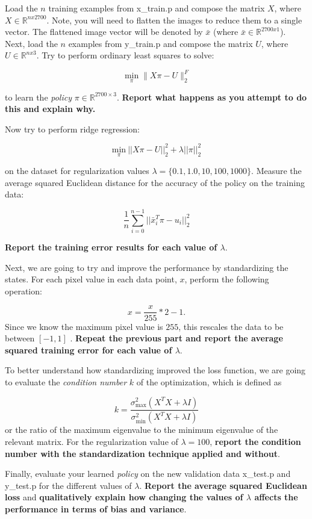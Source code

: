 \begin{Parts}
\Part Load the $n$ training examples from x\_train.p and compose the matrix $X$, where $X \in \mathbb{R}^{nx2700}$. Note, you will need to flatten the images to reduce them to a single vector. The flattened image vector will be denoted by $\bar{x}$ (where $\bar{x} \in \mathbb{R}^{2700x1}$). Next, load the $n$ examples from y\_train.p and compose the matrix $U$, where $U \in \mathbb{R}^{nx3}$. Try to perform ordinary least squares to solve:  

$$\min_{\pi} \|X\pi-U \|^F_2$$

to learn the \emph{policy} $\pi \in \mathbb{R}^{2700 \times 3}$. {\bf Report what happens as you attempt to do this and explain why.}



\Part Now try to perform ridge regression:

$$\underset{\pi}{\mbox{min}} \: ||X\pi-U||^2_2 + \lambda ||\pi||^2_2$$

on the dataset for regularization values $\lambda = \lbrace 0.1,1.0,10,100,1000 \rbrace$. Measure the average squared Euclidean distance for the accuracy of the policy on the training data:

$$\frac{1}{n}\sum_{i =0 }^{n-1} ||\bar{x}_i^T \pi - u_i||^2_2$$ 

{\bf Report the training error results for each value of $\lambda$}.



\Part Next, we are going to try and improve the performance by standardizing the states. For each pixel value in each data point, $x$, perform the following operation: 

	$$x = \frac{x}{255} *2 - 1.$$
 Since we know the maximum pixel value is $255$, this rescales the data to be between $[-1,1]$ . {\bf Repeat the previous part and report the average squared training error for each value of $\lambda$}.




\Part To better understand how standardizing improved the loss function, we are going to evaluate the \emph{condition number} $k$ of the optimization, which is defined as

$$k = \frac{\sigma^2_{\mbox{max}}(X^TX+\lambda I)}{\sigma^2_{\mbox{min}}(X^TX+\lambda I)}$$
or the ratio of the maximum eigenvalue to the minimum eigenvalue of the relevant matrix. For the regularization value of $\lambda = 100$, {\bf report the condition number with the standardization technique applied and without}. 









\Part Finally, evaluate your learned \emph{policy} on the new validation data x\_test.p and y\_test.p for the different values of $\lambda$. {\bf Report the average squared Euclidean loss} and {\bf qualitatively explain how changing the values of $\lambda$ affects the performance in terms of bias and variance}. 




\end{Parts}

